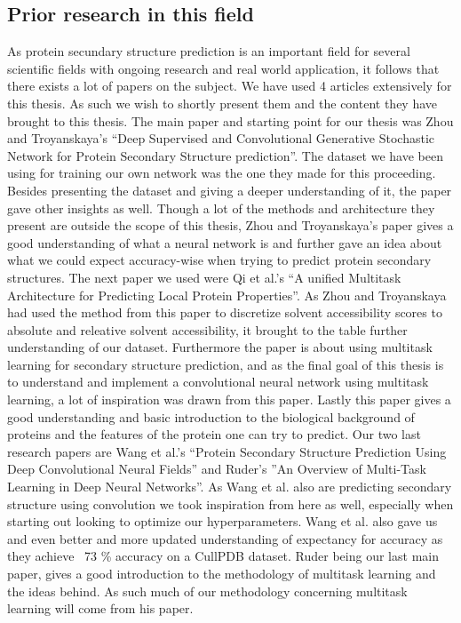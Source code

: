 \subsection{Prior research in this field}

As protein secundary structure prediction is an important field for several scientific fields with ongoing research and real world application, it follows that there exists a lot of papers on the subject. We have used 4 articles extensively for this thesis. As such we wish to shortly present them and the content they have brought to this thesis. 
The main paper and starting point for our thesis was Zhou and Troyanskaya’s “Deep Supervised and Convolutional Generative Stochastic Network for Protein Secondary Structure prediction”. The dataset we have been using for training our own network was the one they made for this proceeding. Besides presenting the dataset and giving a deeper understanding of it, the paper gave other insights as well. Though a lot of the methods and architecture they present are outside the scope of this thesis, Zhou and Troyanskaya’s paper gives a good understanding of what a neural network is and further gave an idea about what we could expect accuracy-wise when trying to predict protein secondary structures. 
The next paper we used were Qi et al.’s “A unified Multitask Architecture for Predicting Local Protein Properties”. As Zhou and Troyanskaya had used the method from this paper to discretize solvent accessibility scores to absolute and releative solvent accessibility, it brought to the table further understanding of our dataset. Furthermore the paper is about using multitask learning for secondary structure prediction, and as the final goal of this thesis is to understand and implement a convolutional neural network using multitask learning, a lot of inspiration was drawn from this paper. Lastly this paper gives a good understanding and basic introduction to the biological background of proteins and the features of the protein one can try to predict. 
Our two last research papers are Wang et al.’s “Protein Secondary Structure Prediction Using Deep Convolutional Neural Fields” and Ruder’s ”An Overview of Multi-Task Learning in Deep Neural Networks”.  As Wang et al. also are predicting secondary structure using convolution we took inspiration from here as well, especially when starting out looking to optimize our hyperparameters. Wang et al. also gave us and even better and more updated understanding of expectancy for accuracy as they achieve ~73 \% accuracy on a CullPDB dataset. Ruder being our last main paper, gives a good introduction to the methodology of multitask learning and the ideas behind. As such much of our methodology concerning multitask learning will come from his paper.











